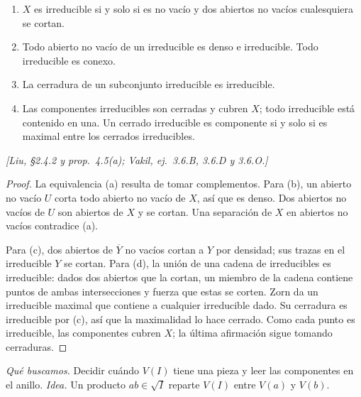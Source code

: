 \begin{lema}
\label{lema:s09-topologia-irreducibles}
\begin{enumerate}[label=(\alph*)]
\item $X$ es irreducible si y solo si es no vacío y dos abiertos no vacíos cualesquiera se cortan.
\item Todo abierto no vacío de un irreducible es denso e irreducible. Todo irreducible es conexo.
\item La cerradura de un subconjunto irreducible es irreducible.
\item Las componentes irreducibles son cerradas y cubren $X$; todo irreducible está contenido en una. Un cerrado irreducible es componente si y solo si es maximal entre los cerrados irreducibles.
\end{enumerate}
\emph{[Liu, \S2.4.2 y prop.~4.5(a); Vakil, ej.~3.6.B, 3.6.D y 3.6.O.]}
\end{lema}
\begin{proof}
La equivalencia (a) resulta de tomar complementos. Para (b), un abierto no vacío $U$ corta todo abierto no vacío de $X$, así que es denso. Dos abiertos no vacíos de $U$ son abiertos de $X$ y se cortan. Una separación de $X$ en abiertos no vacíos contradice (a).

Para (c), dos abiertos de $\overline Y$ no vacíos cortan a $Y$ por densidad; sus trazas en el irreducible $Y$ se cortan. Para (d), la unión de una cadena de irreducibles es irreducible: dados dos abiertos que la cortan, un miembro de la cadena contiene puntos de ambas intersecciones y fuerza que estas se corten. Zorn da un irreducible maximal que contiene a cualquier irreducible dado. Su cerradura es irreducible por (c), así que la maximalidad lo hace cerrado. Como cada punto es irreducible, las componentes cubren $X$; la última afirmación sigue tomando cerraduras.
\end{proof}

\emph{Qué buscamos.} Decidir cuándo $V(I)$ tiene una pieza y leer las componentes en el anillo. \emph{Idea.} Un producto $ab\in\sqrt I$ reparte $V(I)$ entre $V(a)$ y $V(b)$.

